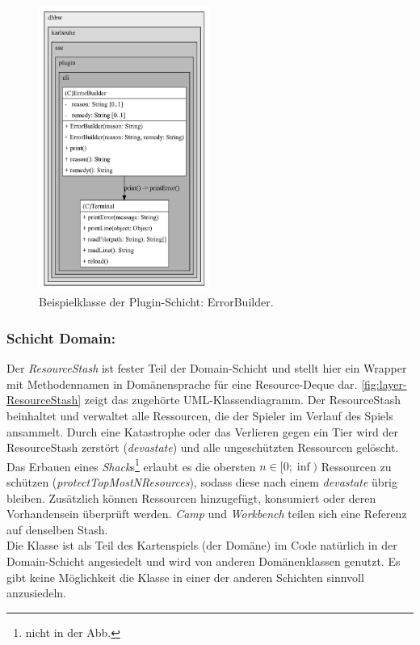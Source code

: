 \begin{figure}[H]
	\centering
	\includegraphics[width=0.5\textwidth]{Bilder/ErrorBuilder_structure.pdf} 
	\caption{Beispielklasse der Plugin-Schicht: ErrorBuilder.}
	\label{fig:layer-ErrorBuilder}
\end{figure} 

\subsubsection{Schicht Domain:}

Der \textit{ResourceStash} ist fester Teil der Domain-Schicht und stellt hier ein Wrapper mit Methodennamen 
in Domänensprache für eine Resource-Deque dar. \autoref{fig:layer-ResourceStash} zeigt das zugehörte UML-Klassendiagramm.
Der ResourceStash beinhaltet und verwaltet alle Ressourcen, die der Spieler im Verlauf des Spiels ansammelt. 
Durch eine Katastrophe oder das Verlieren gegen ein Tier wird der ResourceStash zerstört (\textit{devastate})
und alle ungeschützten Ressourcen gelöscht. Das Erbauen eines \textit{Shack}s\footnote{nicht in der Abb.} 
erlaubt es die obersten $n \in [0;\inf)$ Ressourcen zu schützen (\textit{protectTopMostNResources}), 
sodass diese nach einem \textit{devastate} übrig bleiben. Zusätzlich können Ressourcen hinzugefügt,
konsumiert oder deren Vorhandensein überprüft werden. \textit{Camp} und \textit{Workbench} teilen 
sich eine Referenz auf denselben Stash. \\
Die Klasse ist als Teil des Kartenspiels (der Domäne) im Code natürlich in der Domain-Schicht angesiedelt und 
wird von anderen Domänenklassen genutzt. Es gibt keine Möglichkeit die Klasse in einer der anderen Schichten 
sinnvoll anzusiedeln.

